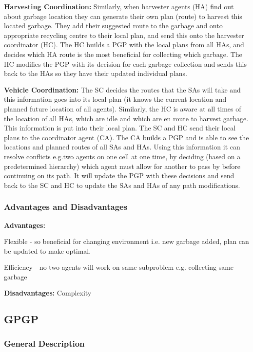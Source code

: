 \textbf{Harvesting Coordination:} Similarly, when harvester agents (HA) find out about garbage location they can generate their own plan (route) to harvest this located garbage. They add their suggested route to the garbage and onto appropriate recycling centre to their local plan, and send this onto the harvester coordinator (HC). The HC builds a PGP with the local plans from all HAs, and decides which HA route is the most beneficial for collecting which garbage. The HC modifies the PGP with its decision for each garbage collection and sends this back to the HAs so they have their updated individual plans. 

\textbf{Vehicle Coordination:} The SC decides the routes that the SAs will take and this information goes into its local plan (it knows the current location and planned future location of all agents). Similarly, the HC is aware at all times of the location of all HAs, which are idle and which are en route to harvest garbage. This information is put into their local plan. The SC and HC send their local plans to the coordinator agent (CA). The CA builds a PGP and is able to see the locations and planned routes of all SAs and HAs. Using this information it can resolve conflicts e.g.two agents on one cell at one time, by deciding (based on a predetermined hierarchy) which agent must allow for another to pass by before continuing on its path. It will update the PGP with these decisions and send back to the SC and HC to update the SAs and HAs of any path modifications.

\subsubsection{Advantages and Disadvantages}

\textbf{Advantages:}

Flexible - so beneficial for changing environment i.e. new garbage added, plan can be updated to make optimal.

Efficiency - no two agents will work on same subproblem e.g. collecting same garbage

\textbf{Disadvantages:} Complexity

\subsection{GPGP}

\subsubsection{General Description}

